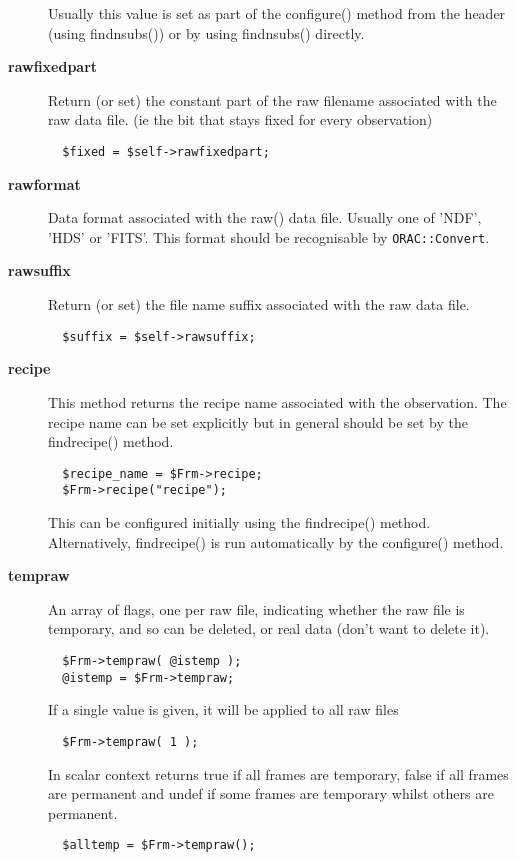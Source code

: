 \begin{description}
Usually this value is set as part of the configure() method from the
header (using findnsubs()) or by using findnsubs() directly.


\item[{\textbf{rawfixedpart}}] \mbox{}

Return (or set) the constant part of the raw filename associated
with the raw data file. (ie the bit that stays fixed for every
observation)

\begin{verbatim}
  $fixed = $self->rawfixedpart;
\end{verbatim}

\item[{\textbf{rawformat}}] \mbox{}

Data format associated with the raw() data file.
Usually one of 'NDF', 'HDS' or 'FITS'. This format should be
recognisable by \texttt{ORAC::Convert}.


\item[{\textbf{rawsuffix}}] \mbox{}

Return (or set) the file name suffix associated with
the raw data file.

\begin{verbatim}
  $suffix = $self->rawsuffix;
\end{verbatim}

\item[{\textbf{recipe}}] \mbox{}

This method returns the recipe name associated with the observation.
The recipe name can be set explicitly but in general should be
set by the findrecipe() method.

\begin{verbatim}
  $recipe_name = $Frm->recipe;
  $Frm->recipe("recipe");
\end{verbatim}


This can be configured initially using the findrecipe() method.
Alternatively, findrecipe() is run automatically by the configure()
method.


\item[{\textbf{tempraw}}] \mbox{}

An array of flags, one per raw file, indicating whether the raw
file is temporary, and so can be deleted, or real data (don't want
to delete it).

\begin{verbatim}
  $Frm->tempraw( @istemp );
  @istemp = $Frm->tempraw;
\end{verbatim}


If a single value is given, it will be applied to all raw files

\begin{verbatim}
  $Frm->tempraw( 1 );
\end{verbatim}


In scalar context returns true if all frames are temporary,
false if all frames are permanent and undef if some frames are temporary
whilst others are permanent.

\begin{verbatim}
  $alltemp = $Frm->tempraw();
\end{verbatim}
\end{description}
